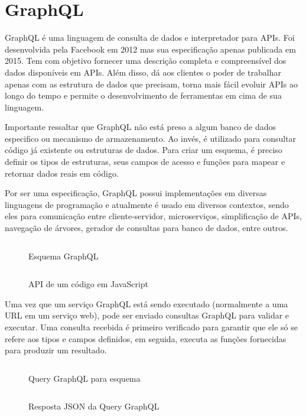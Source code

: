 \section{GraphQL}

GraphQL é uma linguagem de consulta de dados e interpretador para APIs. Foi desenvolvida pela Facebook em 2012 mas sua especificação apenas publicada em 2015. Tem com objetivo fornecer uma descrição completa e compreensível dos dados disponíveis em APIs. Além disso, dá aos clientes o poder de trabalhar apenas com as estrutura de dados que precisam, torna mais fácil evoluir APIs ao longo do tempo e permite o desenvolvimento de ferramentas em cima de sua linguagem. \cite{GraphQL2016}

Importante ressaltar que GraphQL não está preso a algum banco de dados especifico ou mecanismo de armazenamento. Ao invés, é utilizado para consultar código já existente ou estruturas de dados. Para criar um esquema, é preciso definir os tipos de estruturas, seus campos de acesso e funções para mapear e retornar dados reais em código. \cite{GraphQL2016}

Por ser uma especificação, GraphQL possui implementações em diversas linguagens de programação e atualmente é usado em diversos contextos, sendo eles para comunicação entre cliente-servidor, microserviços, simplificação de APIs, navegação de árvores, gerador de consultas para banco de dados, entre outros.

\begin{figure}[h]
  \centering
  \inputminted[frame=single,framesep=10pt]{javascript}{anexos/graphql-schema.gql}
  \caption{Esquema GraphQL}
\end{figure}

\begin{figure}[h]
  \centering
  \inputminted[frame=single,framesep=10pt]{javascript}{anexos/graphql-code.js}
  \caption{API de um código em JavaScript}
\end{figure}

Uma vez que um serviço GraphQL está sendo executado (normalmente a uma URL em um serviço web), pode ser enviado consultas GraphQL para validar e executar. Uma consulta recebida é primeiro verificado para garantir que ele só se refere aos tipos e campos definidos, em seguida, executa as funções fornecidas para produzir um resultado. \cite{GraphQL2016}

\begin{figure}[h]
  \centering
  \inputminted[frame=single,framesep=10pt]{javascript}{anexos/graphql-query.gql}
  \caption{Query GraphQL para esquema}
\end{figure}

\begin{figure}[h]
  \centering
  \inputminted[frame=single,framesep=10pt]{javascript}{anexos/graphql-query-response.json}
  \caption{Resposta JSON da Query GraphQL}
\end{figure}




